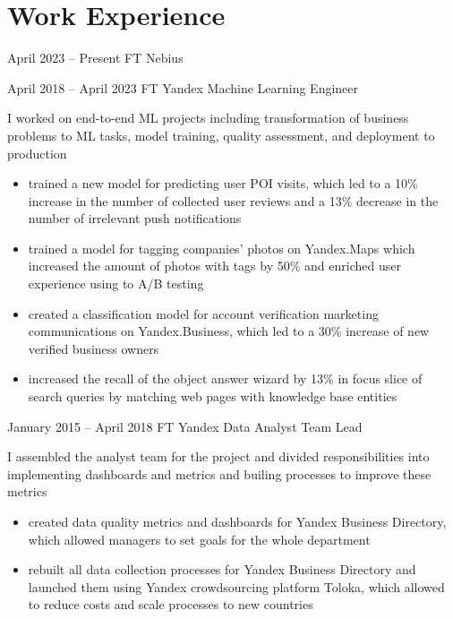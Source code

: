 \section{Work Experience}

\jobentry
    {April 2023 -- Present}
    {FT}
    {Nebius}
    {\currentPosition}
    {}

\jobentry
    {April 2018 -- April 2023}
    {FT}
    {Yandex}
    {Machine Learning Engineer}
    {
        I worked on end-to-end ML projects including transformation of business problems to ML tasks, model training, quality assessment, and deployment to production
        \begin{itemize}
            \item trained a new model for predicting user POI visits, which led to a 10\% increase in the number of collected user reviews and a 13\% decrease in the number of irrelevant push notifications
            \item trained a model for tagging companies' photos on Yandex.Maps which increased the amount of photos with tags by 50\% and enriched user experience using to A/B testing
            \item created a classification model for account verification marketing communications on Yandex.Business, which led to a 30\% increase of new verified business owners
            \item increased the recall of the object answer wizard by 13\% in focus slice of search queries by matching web pages with knowledge base entities
        \end{itemize}
    }

\hrulefill

\jobentry
    {January 2015 -- April 2018}
    {FT}
    {Yandex}
    {Data Analyst Team Lead}
    {
        I assembled the analyst team for the project and divided responsibilities into implementing dashboards and metrics and builing processes to improve these metrics 
        \begin{itemize}
            \item created data quality metrics and dashboards for Yandex Business Directory, which allowed managers to set goals for the whole department
            \item rebuilt all data collection processes for Yandex Business Directory and launched them using Yandex crowdsourcing platform Toloka, which allowed to reduce costs and scale processes to new countries
        \end{itemize}
    }

